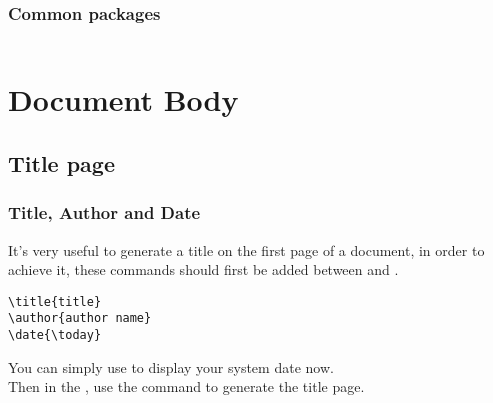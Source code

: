 \begin{frame}[fragile]
	\frametitle{Common packages}
	\inputminted{latex}{examples/packages.tex}

\end{frame}


\section{Document Body}

\begin{frame}
\end{frame}

\subsection{Title page}
\begin{frame}[fragile]
	\frametitle{Title, Author and Date}
	It's very useful to generate a title on the first page of a document, in order to achieve it, these commands should first be added between \LC{\documentclass} and \LC{}.
	\begin{example}
		\begin{verbatim}
\title{title}
\author{author name}
\date{\today}
		\end{verbatim}
	\end{example}
	You can simply use \LC{\date{\today}} to display your system date now.\\[0.5em]
	Then in the , use the command \LC{\maketitle} to generate the title page.
\end{frame}

